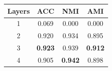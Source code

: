 
\begin{tabular}{cccc}
\hline
Layers  & ACC & NMI & AMI \\
\hline
1 & 0.069 & 0.000 & 0.000\\
2 & 0.920 & 0.934 & 0.895 \\
3 & \textbf{0.923} & 0.939 & \textbf{0.912}\\
4 & 0.905 & \textbf{0.942} & 0.898\\
\hline
\end{tabular}